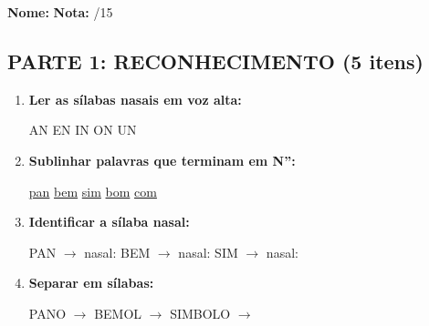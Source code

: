 \begin{exercicio}

\noindent\textbf{Nome:} \underline{\hspace{4cm}} \quad \textbf{Nota:} \underline{\hspace{1cm}}/15

\subsection*{PARTE 1: RECONHECIMENTO (5 itens)}

\begin{enumerate}
  \item \textbf{Ler as sílabas nasais em voz alta:}
  \begin{center}
  AN \quad EN \quad IN \quad ON \quad UN
  \end{center}

  \item \textbf{Sublinhar palavras que terminam em N'':}
  \begin{center}
  \uline{pan} \quad \uline{bem} \quad \uline{sim} \quad \uline{bom} \quad \uline{com}
  \end{center}

  \item \textbf{Identificar a sílaba nasal:}
  \begin{center}
  PAN $\rightarrow$ nasal: \underline{\hspace{1cm}} \quad BEM $\rightarrow$ nasal: \underline{\hspace{1cm}} \quad SIM $\rightarrow$ nasal: \underline{\hspace{1cm}}
  \end{center}

  \item \textbf{Separar em sílabas:}
  \begin{center}
  PANO $\rightarrow$ \underline{\hspace{1.5cm}} \underline{\hspace{1.5cm}} \quad BEMOL $\rightarrow$ \underline{\hspace{1.5cm}} \underline{\hspace{1.5cm}} \quad SIMBOLO $\rightarrow$ \underline{\hspace{1.5cm}} \underline{\hspace{1.5cm}} \underline{\hspace{1.5cm}}
  \end{center}


\end{enumerate}
\end{exercicio}
